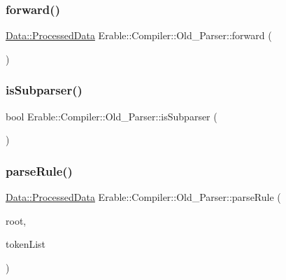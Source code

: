 \subsubsection{\texorpdfstring{forward()}{forward()}}
{\footnotesize\ttfamily \mbox{\hyperlink{struct_erable_1_1_compiler_1_1_data_1_1_processed_data}{Data\+::\+Processed\+Data}} Erable\+::\+Compiler\+::\+Old\+\_\+\+Parser\+::forward (\begin{DoxyParamCaption}{ }\end{DoxyParamCaption})}

\mbox{\label{class_erable_1_1_compiler_1_1_old___parser_a98a0ccf54ede094d2ed00d1e953eeaa5}} 
\subsubsection{\texorpdfstring{isSubparser()}{isSubparser()}}
{\footnotesize\ttfamily bool Erable\+::\+Compiler\+::\+Old\+\_\+\+Parser\+::is\+Subparser (\begin{DoxyParamCaption}{ }\end{DoxyParamCaption})}

\mbox{\label{class_erable_1_1_compiler_1_1_old___parser_ab77eb298a60bd36d81c554703ada42aa}} 
\subsubsection{\texorpdfstring{parseRule()}{parseRule()}}
{\footnotesize\ttfamily \mbox{\hyperlink{struct_erable_1_1_compiler_1_1_data_1_1_processed_data}{Data\+::\+Processed\+Data}} Erable\+::\+Compiler\+::\+Old\+\_\+\+Parser\+::parse\+Rule (\begin{DoxyParamCaption}\item[{\mbox{\hyperlink{namespace_erable_1_1_compiler_1_1_symbols_a8f0bc762f448ea4d84e8713ab3e140b9}{Symbols\+::\+Symbol\+Ptr}}}]{root,  }\item[{Token\+List \&}]{token\+List }\end{DoxyParamCaption})}


